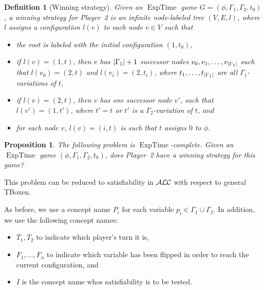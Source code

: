 \documentclass[openany]{scrbook}
\theoremstyle{break}
\newtheorem{Definition}[Theorem]{Definition}
\newtheorem{Proposition}[Theorem]{Proposition}
\theoremstyle{nonumberbreak}
\theoremstyle{nonumberplain}
\theoremstyle{nonumberbreak}
\newcommand{\then}{\Longrightarrow}
\newcommand{\abs}[2][]{\left|{#2}\right|\ifx#1\then\else_{#1}\fi}
\newcommand{\ALC}{{\cal A}{\cal L}{\cal C}}
\newcommand{\ExpTime}{\operatorname{ExpTime}}
\begin{document}
\begin{Definition}[Winning strategy]
  \label{6.10}
  Given an $\ExpTime$ game $G = (\phi, \Gamma_1, \Gamma_2, t_0)$, a
  winning strategy for Player~2 is an infinite node-labeled tree $(V,
  E, l)$, where $l$ assigns a configuration $l(v)$ to each node $v \in
  V$ such that
  \begin{itemize}
  \item the root is labeled with the initial configuration $(1, t_0)$,
  \item if $l(v) = (1, t)$, then $v$ has $\abs{\Gamma_1} + 1$
    successor nodes $v_0, v_1, \dotsc, v_{\abs{\Gamma_1}}$ such that
    $l(v_0) = (2, t)$ and $l(v_i) = (2, t_i)$, where $t_1, \dotsc,
    t_{\abs{\Gamma_1}}$ are all $\Gamma_1$-variations of $t$,
  \item if $l(v) = (2, t)$, then $v$ has one successor node $v'$, such
    that $l(v') = (1, t')$, where $t' = t$ or $t'$ is a
    $\Gamma_2$-variation of $t$, and
  \item for each node $v$, $l(v) = (i, t)$ is such that $t$ assigns
    $0$ to $\phi$.
  \end{itemize}
\end{Definition}

\begin{Proposition}
  \label{6.11}
  The following problem is $\ExpTime$-complete. Given an $\ExpTime$
  game $(\phi, \Gamma_1, \Gamma_2, t_0)$, does Player~2 have a winning
  strategy for this game?
\end{Proposition}

This problem can be reduced to satisfiability in $\ALC$ with respect
to general TBoxen.

As before, we use a concept name $P_i$ for each variable $p_i \in
\Gamma_1 \cup \Gamma_2$. In addition, we use the following concept
names:
\begin{itemize}
\item $T_1, T_2$ to indicate which player's turn it is,
\item $F_1, \dotsc, F_n$ to indicate which variable has been flipped
  in order to reach the current configuration, and
\item $I$ is the concept name whos satisfiability is to be tested.
\end{itemize}
\end{document}
